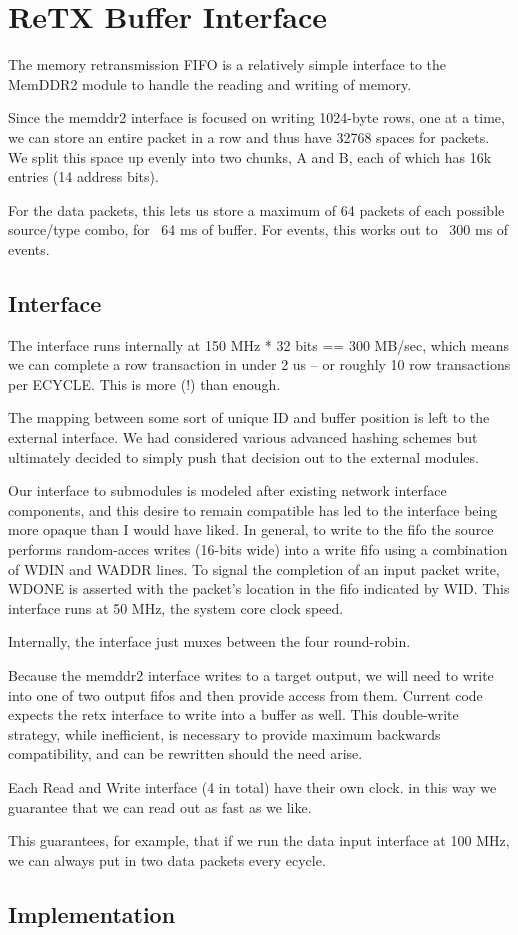 \section{ReTX Buffer Interface} 
The memory retransmission FIFO is a relatively simple interface to the
MemDDR2 module to handle the reading and writing of memory.

Since the memddr2 interface is focused on writing 1024-byte rows, one
at a time, we can store an entire packet in a row and thus have 32768
spaces for packets. We split this space up evenly into two chunks, A
and B, each of which has 16k entries (14 address bits).

For the data packets, this lets us store a maximum of 64 packets of
each possible source/type combo, for ~64 ms of buffer. For events,
this works out to ~300 ms of events.
\subsection{Interface}


The interface runs internally at 150 MHz * 32 bits == 300 MB/sec,
which means we can complete a row transaction in under 2 us -- or
roughly 10 row transactions per ECYCLE. This is more (!) than enough. 

The mapping between some sort of unique ID and buffer position is left
to the external interface. We had considered various advanced hashing
schemes but ultimately decided to simply push that decision out to the
external modules.

Our interface to submodules is modeled after existing network
interface components, and this desire to remain compatible has led to
the interface being more opaque than I would have liked. In general,
to write to the fifo the source performs random-acces writes (16-bits
wide) into a write fifo using a combination of WDIN and WADDR
lines. To signal the completion of an input packet write, WDONE is
asserted with the packet's location in the fifo indicated by WID. This
interface runs at 50 MHz, the system core clock speed.

Internally, the interface just muxes between the four round-robin. 

Because the memddr2 interface writes to a target output, we will need
to write into one of two output fifos and then provide access from
them. Current code expects the retx interface to write into a buffer
as well. This double-write strategy, while inefficient, is necessary
to provide maximum backwards compatibility, and can be rewritten
should the need arise.

Each Read and Write interface (4 in total) have their own clock. in
this way we guarantee that we can read out as fast as we like.

This guarantees, for example, that if we run the data input interface
at 100 MHz, we can always put in two data packets every ecycle.

\subsection{Implementation}
